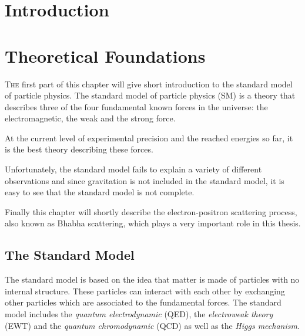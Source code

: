 \documentclass[a4paper,11pt,twosided,final,german,openbib,pdftex,listof=totoc,bibliography=totoc]{scrbook}
\begin{document}
\renewcommand\contentsname{Contents}
\renewcommand\figurename{Figure}
\renewcommand\tablename{Table}
\tableofcontents
\clearpage

\mainmatter
\sloppy

\chapter{Introduction}
\label{sec:Introduction}



\chapter{Theoretical Foundations}
\label{cha:SM}

\lettrine{T}{he} first part of this chapter will give  short introduction to the standard model of particle physics. The standard model of particle physics (SM) is a theory that describes three of the four fundamental known forces in the universe: the electromagnetic, the weak and the strong force. 

 At the current level of experimental precision and the reached energies so far, it is the best theory describing these forces.
 
 Unfortunately, the standard model fails to explain a variety of different observations and since gravitation is not included in the standard model, it is easy to see that the standard model is not complete.
 
 
 Finally this chapter will shortly describe the electron-positron scattering process, also known as Bhabha scattering, which plays a very important role in this thesis.
 
 
\section{The Standard Model}
\label{sec:SM}

The standard model is based on the idea that matter is made of particles with no internal structure. These particles can interact with each other by exchanging other particles which are associated to the fundamental forces. The standard model includes the \textit{quantum electrodynamic} (QED), the \textit{electroweak theory} (EWT) and the \textit{quantum chromodynamic} (QCD) as well as the \textit{Higgs mechanism}.\\
\end{document}
